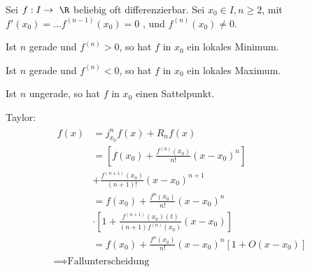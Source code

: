 \begin{beh}
	Sei $f: I \rightarrow \R$ beliebig oft differenzierbar. Sei $x_0 \in I , n \geq 2$, mit $f'(x_0) = \dots f^{(n-1)}(x_0) = 0$ , und $f^{(n)}(x_0) \neq 0$.
	
	Ist $n$ gerade und $f^{(n)} > 0 $, so hat $f$ in $x_0$ ein lokales Minimum.
	
	Ist $n$ gerade und $f^{(n)} < 0 $, so hat $f$ in $x_0$ ein lokales Maximum.
	
	Ist $n$ ungerade, so hat $f$ in $x_0$ einen Sattelpunkt.
	
	\begin{bew}[head = Wieso:]
		Taylor:
		\begin{gather*}
			\begin{split}
				f(x)	&= j_{x_0}^n f(x) + R_n f(x) \\
					&= \left[ f(x_0) + \frac{f^{(n)}(x_0)}{n!} (x-x_0)^n \right] \\
					&+ \frac{f^{(n+1)}(x_0)}{(n+1)!} (x-x_0)^{n+1} \\
					&= f(x_0) + \frac{f^{n}(x_0)}{n!} (x-x_0)^n \\
					&\cdot \left[ 1 + \frac{f^{(n+1)}(x_0)(t)}{(n+1) f^{(n)}(x_0)} (x-x_0) \right] \\
					&=  f(x_0) + \frac{f^{n}(x_0)}{n!} (x-x_0)^n [ 1 + O(x-x_0) ]
			\end{split} \\
			\implies \text{Fallunterscheidung}
		\end{gather*}
	\end{bew}
\end{beh}


